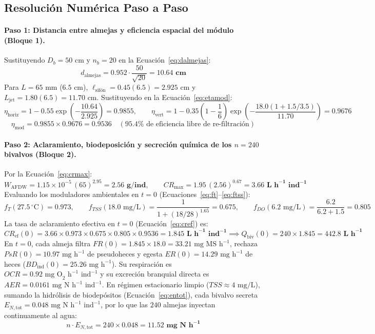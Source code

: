 \documentclass[11pt,letterpaper]{article}
\begin{document}
\subsection{Resolución Numérica Paso a Paso}

\paragraph{Paso 1: Distancia entre almejas y eficiencia espacial del módulo (Bloque 1).}
Sustituyendo $D_b = 50\text{ cm}$ y $n_b = 20$ en la Ecuación~\eqref{eq:dalmejas}:
\[
    d_{\text{almejas}} = 0.952 \cdot \frac{50}{\sqrt{20}} = \mathbf{10.64\text{ cm}}
\]
Para $L = 65\text{ mm}$ ($6.5\text{ cm}$), $\ell_{\text{sifón}} = 0.45(6.5) = 2.925\text{ cm}$ y $L_{\text{jet}} = 1.80(6.5) = 11.70\text{ cm}$. Sustituyendo en la Ecuación~\eqref{eq:etamod}:
\[
    \eta_{\text{horiz}} = 1 - 0.55 \exp\!\left(-\frac{10.64}{2.925}\right) = 0.9855, \qquad \eta_{\text{vert}} = 1 - 0.35\left(1 - \frac{1}{6}\right)\exp\!\left(-\frac{18.0(1 + 1.5/3.5)}{11.70}\right) = 0.9676
\]
\[
    \eta_{\text{mod}} = 0.9855 \times 0.9676 = \mathbf{0.9536} \quad (95.4\%\text{ de eficiencia libre de re-filtración})
\]

\paragraph{Paso 2: Aclaramiento, biodeposición y secreción química de los $n = 240$ bivalvos (Bloque 2).}
Por la Ecuación~\eqref{eq:crmax}:
\[
    W_{\text{AFDW}} = 1.15\times 10^{-5}\,(65)^{2.95} = \mathbf{2.56\text{ g/ind}}, \qquad CR_{\max} = 1.95\,(2.56)^{0.67} = \mathbf{3.66\text{ L h}^{-1}\text{ ind}^{-1}}
\]
Evaluando los moduladores ambientales en $t=0$ (Ecuaciones~\ref{eq:ft}--\ref{eq:ftss}):
\[
    f_T(27.5\,^\circ\text{C}) = \mathbf{0.973}, \qquad f_{TSS}(18.0\text{ mg/L}) = \frac{1}{1 + (18/28)^{1.65}} = \mathbf{0.675}, \qquad f_{DO}(6.2\text{ mg/L}) = \frac{6.2}{6.2 + 1.5} = \mathbf{0.805}
\]
La tasa de aclaramiento efectiva en $t=0$ (Ecuación~\ref{eq:cref}) es:
\[
    CR_{\text{ef}}(0) = 3.66 \times 0.973 \times 0.675 \times 0.805 \times 0.9536 = \mathbf{1.845\text{ L h}^{-1}\text{ ind}^{-1}} \implies Q_{\text{biv}}(0) = 240 \times 1.845 = \mathbf{442.8\text{ L h}^{-1}}
\]
En $t=0$, cada almeja filtra $FR(0) = 1.845 \times 18.0 = 33.21\text{ mg MS h}^{-1}$, rechaza $PsR(0) = 10.97\text{ mg h}^{-1}$ de pseudoheces y egesta $ER(0) = 14.29\text{ mg h}^{-1}$ de heces ($BD_{\text{ind}}(0) = 25.26\text{ mg h}^{-1}$). Su respiración es $OCR = 0.92\text{ mg O}_2\text{ h}^{-1}\text{ ind}^{-1}$ y su excreción branquial directa es $AER = 0.0161\text{ mg N h}^{-1}\text{ ind}^{-1}$. En régimen estacionario limpio ($TSS \approx 4\text{ mg/L}$), sumando la hidrólisis de biodepósitos (Ecuación~\ref{eq:entot}), cada bivalvo secreta $E_{N,\text{tot}} = 0.048\text{ mg N h}^{-1}\text{ ind}^{-1}$, por lo que las $240$ almejas inyectan continuamente al agua:
\[
    n \cdot E_{N,\text{tot}} = 240 \times 0.048 = \mathbf{11.52\text{ mg N h}^{-1}}
\]
\end{document}

